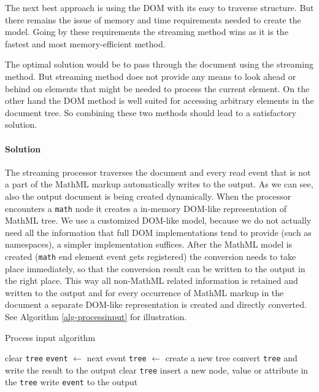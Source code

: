 \documentclass[11pt,oneside,final]{fithesis2}
\begin{document}
The next best approach is using the DOM with its easy to traverse structure. But there remains the issue of memory and time requirements needed to create the model. Going by these requirements the streaming method wins as it is the fastest and most memory-efficient method.

The optimal solution would be to pass through the document using the streaming method. But streaming method does not provide any means to look ahead or behind on elements that might be needed to process the current element. On the other hand the DOM method is well suited for accessing arbitrary elements in the document tree. So combining these two methods should lead to a satisfactory solution. 

\paragraph*{Solution}\label{inputprocessing:solution} The streaming processor traverses the document and every read event that is not a part of the MathML markup automatically writes to the output. As we can see, also the output document is being created dynamically. When the processor encounters a \texttt{math} node it creates a in-memory DOM-like representation of MathML tree. We use a customized DOM-like model, because we do not actually need all the information that full DOM implementations tend to provide (such as namespaces), a simpler implementation suffices. After the MathML model is created (\texttt{math} end element event gets registered) the conversion needs to take place immediately, so that the conversion result can be written to the output in the right place. This way all non-MathML related information is retained and written to the output and for every occurrence of MathML markup in the document a separate DOM-like representation is created and directly converted. See Algorithm \ref{alg-processinput} for illustration. 
\fi

\begin{algorithm}[!ht]
\caption{Process input algorithm}
\label{alg-processinput}
\begin{algorithmic}[1]
	\State clear \texttt{tree}
		\State \texttt{event} $\gets$ next event
			\State \texttt{tree} $\gets$ create a new tree
			\State convert \texttt{tree} and write the result to the output
			\State clear \texttt{tree}			
			\State insert a new node, value or attribute in the \texttt{tree}
		\Else
			\State write \texttt{event} to the output
		\EndIf
	\EndWhile
\EndProcedure
\end{algorithmic}
\end{algorithm}
\end{document}
